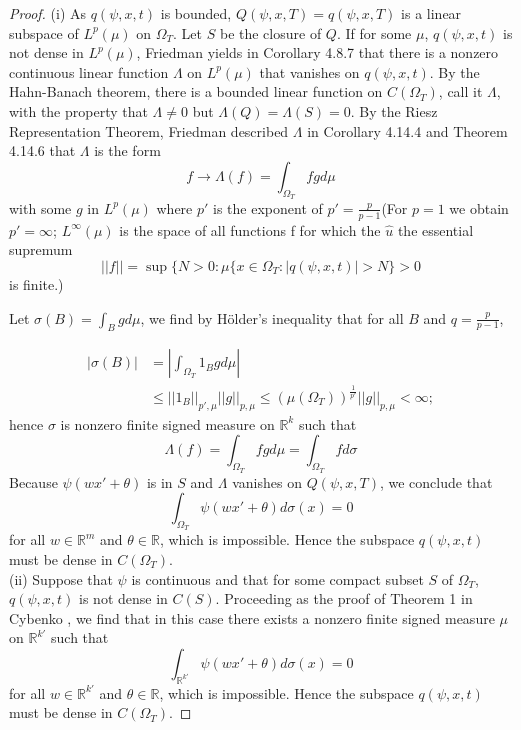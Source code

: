 \documentclass{article}
\begin{document}
\begin{proof}
	(i) As $q(\psi,x,t)$ is bounded, $Q(\psi,x,T)={q(\psi,x,T)}$ is a linear subspace of $L^{p}(\mu)$ on $\Omega_{T}$. 
Let $S$ be the closure of $Q$.
If for some $\mu$, $q(\psi,x,t)$ is not dense in $L^{p}(\mu)$, Friedman yields in Corollary 4.8.7 \cite{friedman} that there is a nonzero continuous linear function $\Lambda$ on $L^{p}(\mu)$ that vanishes on $q(\psi,x,t)$. 
By the Hahn-Banach theorem, there is a bounded linear function on $C(\Omega_{T})$, call it $\Lambda$, 
with the property that $\Lambda\neq 0$ but $\Lambda(Q)=\Lambda(S)=0$. 
By the Riesz Representation Theorem, Friedman described $\Lambda$ in Corollary 4.14.4 and Theorem 4.14.6 \cite{friedman} that $\Lambda$ is the form
	\[f \rightarrow \Lambda(f)=\int_{\Omega_{T}}fg d\mu\]
	with some $g$ in $L^{p}(\mu)$ where $p'$ is the exponent of $p'=\frac{p}{p-1}$(For $p=1$ we obtain $p' = \infty$; $L^{\infty}(\mu)$ is the space of all functions f for which the $\hat{u}$ the essential supremum
		\[||f|| =\sup\{N>0 : \mu \{x \in \Omega_{T} : |q(\psi,x,t)| > N\} > 0 \]
		is finite.)

		Let $\sigma(B) = \int_{B} g d\mu$, we find by H\"older's inequality that for all $B$ and $q=\frac{p}{p-1}$,

		\begin{equation}
		\begin{aligned}
		\left|\sigma(B)\right| &= \left|\int_{\Omega_{T}}1_{B}g d \mu\right|\\
		 & \leq ||1_{B}||_{p',\mu} ||g||_{p,\mu} \leq (\mu(\Omega_{T}))^{\frac{1}{p'}}||g||_{p,\mu} < \infty;
		 \end{aligned}
		\end{equation}
	     hence $\sigma$ is nonzero finite signed measure on $\mathbb R^{k}$ such that
	     \begin{equation}
	     \Lambda(f) =\int_{\Omega_{T}}fg d\mu =  \int_{\Omega_{T}}f d\sigma
	     \end{equation}
Because $\psi(wx'+\theta)$ is in $S$ and $\Lambda$ vanishes on $Q(\psi,x,T)$, we conclude that
	     \begin{equation}
	     \int_{\Omega_{T}} \psi(wx'+\theta)d \sigma(x) = 0
	    \end{equation}
	    for all $w \in\mathbb{R}^{m}$ and $\theta \in \mathbb{R}$, which is impossible.
Hence the subspace $q(\psi,x,t)$ must be dense in $C(\Omega_{T})$.\\

	    (ii) Suppose that $\psi$ is continuous and that for some compact subset $S$ of $\Omega_{T}$, $q(\psi,x,t)$ is not dense in $C(S)$. Proceeding as the proof of Theorem 1 in Cybenko \cite{cybenko}, we find that in this case there exists a nonzero finite signed measure $\mu$ on $\mathbb R^{k'}$ such that
	    \[ \int_{\mathbb{R}^{k'}} \psi(wx'+\theta)d \sigma(x) = 0\]
	    for all $w \in\mathbb{R}^{k'}$ and $\theta \in \mathbb{R}$, which is impossible.
Hence the subspace $q(\psi, x, t)$ must be dense in $C(\Omega_{T})$.
\end{proof}
\end{document}

